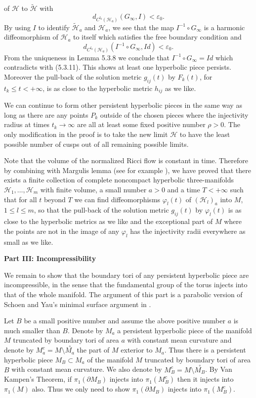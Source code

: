 of $\mathcal{H}$ to $\widetilde{\mathcal{H}}$ with
$$
d_{C^{l_0}(\mathcal{H}_a)}(G_\infty,I)<\varepsilon_0.
$$
By using $I$ to identify $\widetilde{\mathcal{H}}_a$ and
$\mathcal{H}_a$, we see that the map $I^{-1}\circ G_\infty $ is a
harmonic diffeomorphism of $\mathcal{H}_a$ to itself which
satisfies the free boundary condition and
$$
d_{C^{l_0}(\mathcal{H}_a)}(I^{-1}\circ G_\infty,Id)<\varepsilon_0.
$$
{}From the uniqueness in Lemma 5.3.8 we conclude that $I^{-1}\circ
G_\infty =Id$ which contradicts with (5.3.11). This shows at least
one hyperbolic piece persists. Moreover the pull-back of the
solution metric $g_{ij}(t)$ by $F_k(t)$, for $t_k\leq t<+\infty$,
is as close to the hyperbolic metric $h_{ij}$ as we like.

We can continue to form other persistent hyperbolic pieces in the
same way as long as there are any points $P_k$ outside of the
chosen pieces where the injectivity radius at times
$t_k\rightarrow \infty$ are all at least some fixed positive
number $\rho >0$. The only modification in the proof is to take
the new limit $\mathcal{H}$ to have the least possible number of
cusps out of all remaining possible limits.

Note that the volume of the normalized Ricci flow is constant in
time. Therefore by combining with Margulis lemma (see for example
\cite{Gro79} \cite{KM}), we have proved that there exists a finite
collection of complete noncompact hyperbolic three-manifolds
${\mathcal{H}}_1,\ldots,{\mathcal{H}}_m $ with finite volume, a
small number $a>0$ and a time $T<+\infty$ such that for all $t$
beyond $T$ we can find diffeomorphisms $\varphi_l(t)$ of
$({\mathcal{H}}_{l})_a $ into $M$, $1\leq l\leq m$, so that the
pull-back of the solution metric $g_{ij}(t)$ by $\varphi_l(t)$ is
as close to the hyperbolic metrics as we like and the exceptional
part of $M$ where the points are not in the image of any
$\varphi_l$ has the injectivity radii everywhere as small as we
like.

\medskip
{\bf Part III: Incompressibility} \vskip 0.2cm

We remain to show that the boundary tori of any persistent
hyperbolic piece are incompressible, in the sense that the
fundamental group of the torus injects into that of the whole
manifold. The argument of this part is a parabolic version of
Schoen and Yau's minimal surface argument in \cite{ScY79m, ScY79,
ScY82}.

Let $B$ be a small positive number and assume the above positive
number $a$ is much smaller than $B$. Denote by $M_a$ a persistent
hyperbolic piece of the manifold $M$ truncated by boundary tori of
area $a$ with constant mean curvature and denote by $M_a^c=M
\setminus \stackrel{\circ}{M_a}$ the part of $M$ exterior to
$M_a$. Thus there is a persistent hyperbolic piece $M_B \subset
M_a$ of the manifold $M$ truncated by boundary tori of area $B$
with constant mean curvature. We also denote by $M_B^c=M \setminus
\stackrel{\circ}{M_B}$. By Van Kampen's Theorem, if
$\pi_1(\partial M_B)$ injects into $\pi_1(M_B^c)$ then it injects
into $\pi_1(M)$ also. Thus we only need to show $\pi_1(\partial
M_B)$ injects into $\pi_1(M_B^c)$.

